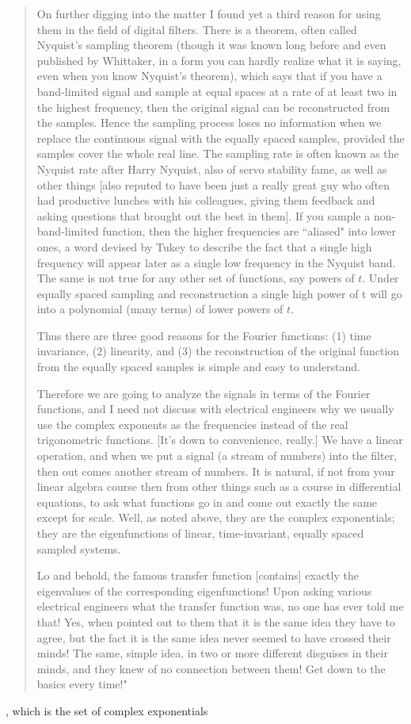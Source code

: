 \documentclass[10pt]{article}
\begin{document}
{\begin{quotation}
On further digging into the matter I found yet a third reason for using them in the field of digital filters. There is a theorem, often called Nyquist's sampling theorem (though it was known long before and even published by Whittaker, in a form you can hardly realize what it is saying, even when you know Nyquist's theorem), which says that if you have a band-limited signal and sample at equal spaces at a rate of at least two in the highest frequency, then the original signal can be reconstructed from the samples. Hence the sampling process loses no information when we replace the continuous signal with the equally spaced samples, provided the samples cover the whole real line. The sampling rate is often known as the Nyquist rate after Harry Nyquist, also of servo stability fame, as well as other things [also reputed to have been just a really great guy who often had productive lunches with his colleagues, giving them feedback and asking questions that brought out the best in them]. If you sample a non-band-limited function, then the higher frequencies are ``aliased" into lower ones, a word devised by Tukey to describe the fact that a single high frequency will appear later as a single low frequency in the Nyquist band. The same is not true for any other set of functions, say powers of $t$. Under equally spaced sampling and reconstruction a single high power of t will go into a polynomial (many terms) of lower powers of $t$.

Thus there are three good reasons for the Fourier functions: (1) time invariance, (2) linearity, and (3) the reconstruction of the original function from the equally spaced samples is simple and easy to understand.

Therefore we are going to analyze the signals in terms of the Fourier functions, and I need not discuss with electrical engineers why we usually use the complex exponents as the frequencies instead of the real trigonometric functions. [It's down to convenience, really.] We have a linear operation, and when we put a signal (a stream of numbers) into the filter, then out comes another stream of numbers. It is natural, if not from your linear algebra course then from other things such as a course in differential equations, to ask what functions go in and come out exactly the same except for scale. Well, as noted above, they are the complex exponentials; they are the eigenfunctions of linear, time-invariant, equally spaced sampled systems.

Lo and behold, the famous transfer function [contains] exactly the eigenvalues of the corresponding eigenfunctions! Upon asking various electrical engineers what the transfer function was, no one has ever told me that! Yes, when pointed out to them that it is the same idea they have to agree, but the fact it is the same idea never seemed to have crossed their minds! The same, simple idea, in two or more different disguises in their minds, and they knew of no connection between them! Get down to the basics every time!"\end{quotation}}, which is the set of complex exponentials
\end{document}
